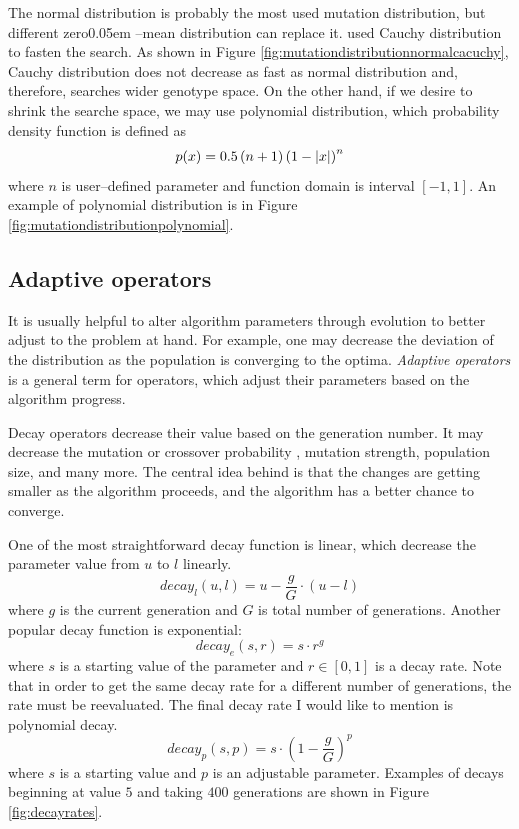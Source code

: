 The normal distribution is probably the most used mutation distribution, but different zero\kern0.05em --mean distribution can replace it. \citet*{CauchyDistributionMutation} used Cauchy distribution to fasten the search. As shown in Figure \ref{fig:mutationdistributionnormalcacuchy}, Cauchy distribution does not decrease as fast as normal distribution and, therefore, searches wider genotype space. On the other hand, if we desire to shrink the searche space, we may use polynomial distribution, which probability density function is defined as
$$
p(x)=0.5 \left(n + 1\right)\left( 1 - \left|{x}\right| \right)^n
$$ 
where $n$ is user--defined parameter and function domain is interval $\left[-1,1\right]$. An example of polynomial distribution is in Figure \ref{fig:mutationdistributionpolynomial}.

\subsection{Adaptive operators}
\label{chap:adaptiveoperators}

It is usually helpful to alter algorithm parameters through evolution to better adjust to the problem at hand. For example, one may decrease the deviation of the distribution as the population is converging to the optima. \emph{Adaptive operators} is a general term for operators, which adjust their parameters based on the algorithm progress.

Decay operators decrease their value based on the generation number. It may decrease the mutation or crossover probability \citep{DecayGA}, mutation strength, population size, and many more. The central idea behind is that the changes are getting smaller as the algorithm proceeds, and the algorithm has a better chance to converge.

One of the most straightforward decay function is linear, which decrease the parameter value from $u$ to $l$ linearly.
$$
decay_l(u,l) = u - \frac{g}{G}\cdot\left( u - l \right)
$$
where $g$ is the current generation and $G$ is total number of generations. Another popular decay function is exponential:
$$
decay_e(s,r) = s\cdot r^g
$$
where $s$ is a starting value of the parameter and $r\in\left[0,1\right]$ is a decay rate. Note that in order to get the same decay rate for a different number of generations, the rate must be reevaluated.
The final decay rate I would like to mention is polynomial decay.
$$
decay_p(s,p) = s \cdot\left(1 - \frac{g}{G}\right)^p
$$
where $s$ is a starting value and $p$ is an adjustable parameter. Examples of decays beginning at value $5$ and taking $400$ generations are shown in Figure \ref{fig:decayrates}.

